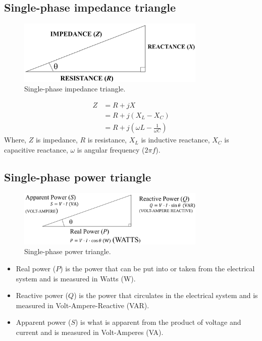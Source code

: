 \subsection{Single-phase impedance triangle}
\begin{figure}[H]
	\centering
	\includegraphics[width = 0.8\textwidth]{./img/figure9.png}
	\caption{Single-phase impedance triangle.}
\end{figure}
\begin{align}
	Z & = R + jX                                          \\
	  & = R + j\left(X_L - X_C\right)                     \\
	  & = R + j\left(\omega L - \frac{1}{\omega C}\right)
\end{align}
Where, $Z$ is impedance, $R$ is resistance, $X_L$ is inductive reactance, $X_C$ is capacitive reactance, $\omega$ is angular frequency ($2\pi f$).
\subsection{Single-phase power triangle}
\begin{figure}[H]
	\centering
	\includegraphics[width = 0.8\textwidth]{./img/figure10.png}
	\caption{Single-phase power triangle.}
\end{figure}
\begin{itemize}
	\item Real power ($P$) is the power that can be put into or taken from the electrical system and is measured in Watts (\si{\watt}).
	\item Reactive power ($Q$) is the power that circulates in the electrical system and is measured in Volt-Ampere-Reactive (VAR).
	\item Apparent power ($S$) is what is apparent from the product of voltage and current and is measured in Volt-Amperes (VA).
\end{itemize}

